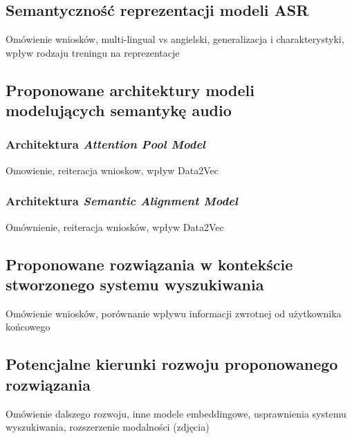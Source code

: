 \subsection{Semantyczność reprezentacji modeli ASR}
Omówienie wniosków, multi-lingual vs angielski, generalizacja i charakterystyki, wpływ rodzaju treningu na reprezentacje

\subsection{Proponowane architektury modeli modelujących semantykę audio}
\subsubsection{Architektura \textit{Attention Pool Model}}
Omowienie, reiteracja wnioskow, wpływ Data2Vec
\subsubsection{Architektura \textit{Semantic Alignment Model}}
Omównienie, reiteracja wniosków, wpływ Data2Vec

\subsection{Proponowane rozwiązania w kontekście stworzonego systemu wyszukiwania}
Omówienie wniosków, porównanie wpływu informacji zwrotnej od użytkownika końcowego

\subsection{Potencjalne kierunki rozwoju proponowanego rozwiązania}
Omówienie dalszego rozwoju, inne modele embeddingowe, usprawnienia systemu wyszukiwania, rozszerzenie modalności (zdjęcia)